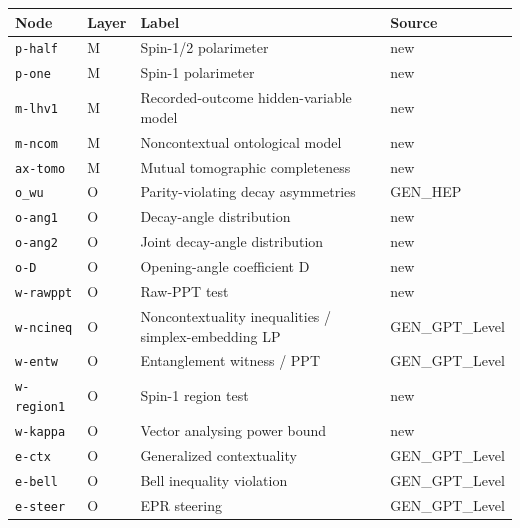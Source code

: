 \begin{ruledtabular}
\begin{tabular}{llll}
Node & Layer & Label & Source \\
\hline
\texttt{p-half} & M & Spin-1/2 polarimeter & new \\
\texttt{p-one} & M & Spin-1 polarimeter & new \\
\texttt{m-lhv1} & M & Recorded-outcome hidden-variable model & new \\
\texttt{m-ncom} & M & Noncontextual ontological model & new \\
\texttt{ax-tomo} & M & Mutual tomographic completeness & new \\
\texttt{o\_wu} & O & Parity-violating decay asymmetries & GEN\_HEP \\
\texttt{o-ang1} & O & Decay-angle distribution & new \\
\texttt{o-ang2} & O & Joint decay-angle distribution & new \\
\texttt{o-D} & O & Opening-angle coefficient D & new \\
\texttt{w-rawppt} & O & Raw-PPT test & new \\
\texttt{w-ncineq} & O & Noncontextuality inequalities / simplex-embedding LP & GEN\_GPT\_Level \\
\texttt{w-entw} & O & Entanglement witness / PPT & GEN\_GPT\_Level \\
\texttt{w-region1} & O & Spin-1 region test & new \\
\texttt{w-kappa} & O & Vector analysing power bound & new \\
\texttt{e-ctx} & O & Generalized contextuality & GEN\_GPT\_Level \\
\texttt{e-bell} & O & Bell inequality violation & GEN\_GPT\_Level \\
\texttt{e-steer} & O & EPR steering & GEN\_GPT\_Level \\
\end{tabular}
\end{ruledtabular}
